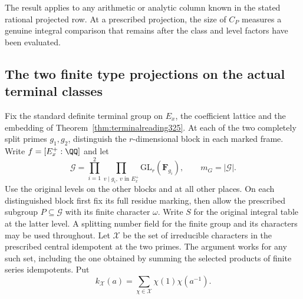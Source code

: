 \documentclass[a4paper,11pt]{article}
\theoremstyle{definition}
\theoremstyle{remark}
\numberwithin{equation}{section}
\begin{document}
The result applies to any arithmetic or analytic column
known in the stated rational projected row. At a prescribed
projection, the size of \(C_P\) measures a genuine integral
comparison that remains after the class and level factors
have been evaluated.

\subsection{The two finite type projections on the actual terminal classes}\label{nav:IV-63}
Fix the standard definite terminal group on \(E_x\), the coefficient
lattice and the embedding of Theorem~\ref{thm:terminalreading325}.
At each of the two completely split primes \(g_1,g_2\), distinguish
the \(r\)-dimensional block in each marked frame. Write \(f=[E_x^+:\QQ]\)
and let
\[
 \mathcal G=\prod_{i=1}^2\prod_{v\mid g_i,\ v\text{ in }E_x^+}
                \mathrm{GL}_r(\mathbf F_{g_i}),\qquad m_G=|\mathcal G|.
\]
Use the original levels on the other blocks and at all other
places. On each distinguished block first fix its full residue
marking, then allow the prescribed subgroup \(P\subseteq\mathcal G\)
with its finite character \(\omega\). Write \(S\) for the original
integral table at the latter level. A splitting number field for
the finite group and its characters may be used throughout.
Let \(\mathcal X\) be the set of irreducible characters in the
prescribed central idempotent at the two primes. The argument
works for any such set, including the one obtained by summing
the selected products of finite series idempotents. Put
\[
 k_{\mathcal X}(a)=\sum_{\chi\in\mathcal X}\chi(1)\chi(a^{-1}).
\]
\end{document}
